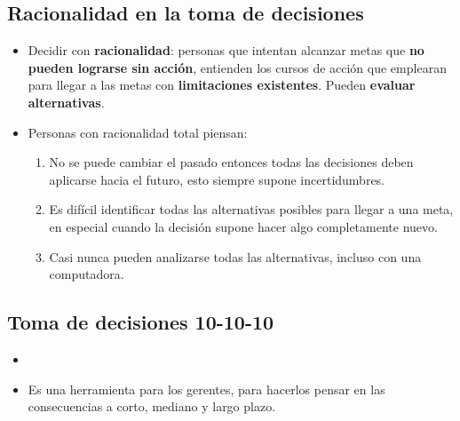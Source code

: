 \documentclass{article}
\begin{document}
\subsection{Racionalidad en la toma de decisiones}
\begin{itemize}
    \item Decidir con \textbf{racionalidad}: personas que intentan alcanzar metas que \textbf{no pueden lograrse sin acción}, entienden los cursos de acción que emplearan para llegar a las metas con \textbf{limitaciones existentes}. Pueden \textbf{evaluar alternativas}. 
    \item Personas con racionalidad total piensan:
        \begin{enumerate}
            \item No se puede cambiar el pasado entonces todas las decisiones deben aplicarse hacia el futuro, esto siempre supone incertidumbres.
            \item Es difícil identificar todas las alternativas posibles para llegar a una meta, en especial cuando la decisión supone hacer algo completamente nuevo. 
            \item Casi nunca pueden analizarse todas las alternativas, incluso con una computadora. 
        \end{enumerate}
\end{itemize} 


\subsection{Toma de decisiones 10-10-10}
\begin{itemize}
    \item {}
    \item Es una herramienta para los gerentes, para hacerlos pensar en las consecuencias a corto, mediano y largo plazo.
\end{itemize}


\end{document}
